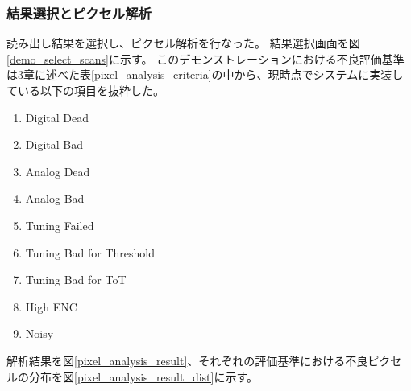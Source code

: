 \clearpage
\subsubsection{結果選択とピクセル解析}
読み出し結果を選択し、ピクセル解析を行なった。
結果選択画面を図\ref{demo_select_scans}に示す。
このデモンストレーションにおける不良評価基準は3章に述べた表\ref{pixel_analysis_criteria}の中から、現時点でシステムに実装している以下の項目を抜粋した。
\begin{enumerate}
  \item Digital Dead 
  \item Digital Bad 
  \item Analog Dead 
  \item Analog Bad 
  \item Tuning Failed
  \item Tuning Bad for Threshold
  \item Tuning Bad for ToT
  \item High ENC
  \item Noisy
\end{enumerate}

解析結果を図\ref{pixel_analysis_result}、それぞれの評価基準における不良ピクセルの分布を図\ref{pixel_analysis_result_dist}に示す。

